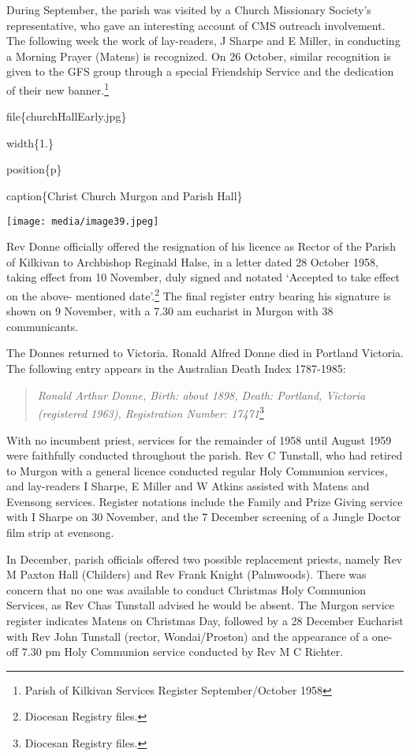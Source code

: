 During September, the parish was visited by a Church Missionary Society's representative, who gave an interesting account of CMS outreach involvement. The following week the work of lay-readers, J Sharpe and E Miller, in conducting a Morning Prayer (Matens) is recognized. On 26 October, similar recognition is given to the GFS group through a special Friendship Service and the dedication of their new banner.\footnote{Parish of Kilkivan Services Register September/October 1958}

file\{churchHallEarly.jpg\}

width\{1.\}

position\{p\}

caption\{Christ Church Murgon and Parish Hall\}

\texttt{[image: media/image39.jpeg]}

Rev Donne officially offered the resignation of his licence as Rector of the Parish of Kilkivan to Archbishop Reginald Halse, in a letter dated 28 October 1958, taking effect from 10 November, duly signed and notated `Accepted to take effect on the above- mentioned date'.\footnote{Diocesan Registry files.} The final register entry bearing his signature is shown on 9 November, with a 7.30 am eucharist in Murgon with 38 communicants.

The Donnes returned to Victoria. Ronald Alfred Donne died in Portland Victoria. The following entry appears in the Australian Death Index 1787-1985:

\begin{quote}
\emph{Ronald Arthur Donne, Birth: about 1898, Death: Portland, Victoria (registered 1963), Registration Number: 17471}\footnote{Diocesan Registry files.}
\end{quote}

With no incumbent priest, services for the remainder of 1958 until August 1959 were faithfully conducted throughout the parish. Rev C Tunstall, who had retired to Murgon with a general licence conducted regular Holy Communion services, and lay-readers I Sharpe, E Miller and W Atkins assisted with Matens and Evensong services. Register notations include the Family and Prize Giving service with I Sharpe on 30 November, and the 7 December screening of a Jungle Doctor film strip at evensong.

In December, parish officials offered two possible replacement priests, namely Rev M Paxton Hall (Childers) and Rev Frank Knight (Palmwoods). There was concern that no one was available to conduct Christmas Holy Communion Services, as Rev Chas Tunstall advised he would be absent. The Murgon service register indicates Matens on Christmas Day, followed by a 28 December Eucharist with Rev John Tunstall (rector, Wondai/Proston) and the appearance of a one-off 7.30 pm Holy Communion service conducted by Rev M C Richter.

